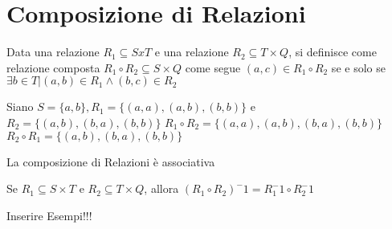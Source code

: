 \section{Composizione di Relazioni}
Data una relazione $R_1 \subseteq S x T$ e una relazione $R_2 \subseteq T \times Q$,
si definisce come relazione composta $R_1 \circ R_2 \subseteq S \times Q$ come segue
$(a,c) \in R_1 \circ R_2$ se e solo se  $\exists b \in T | (a,b) \in R_1 \land (b,c) \in R_2$

Siano $S = \{ a,b \}, R_1 = \{ (a,a),(a,b),(b,b) \}$ e $R_2 = \{ (a,b),(b,a),(b,b) \}$
$R_1 \circ R_2 = \{ (a,a),(a,b),(b,a),(b,b) \}$ \newline
$R_2 \circ R_1 = \{ (a,b),(b,a),(b,b) \}$

\begin{prop}
La composizione di Relazioni è associativa
\end{prop}

\begin{thm}
Se $R_1 \subseteq S \times T$ e $R_2 \subseteq T \times Q$, allora $(R_1 \circ R_2)^-1 = R_1^-1 \circ R_2^-1$
\end{thm}


Inserire Esempi!!!
